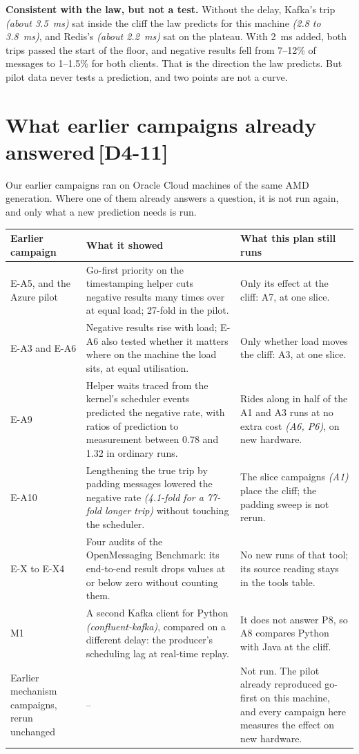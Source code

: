 \documentclass[11pt]{article}
\newcommand{\gl}[1]{{\color{soft}\itshape\small (#1)}}
\newcommand{\chgold}[1]{\,{\color{oldcol}\bfseries\footnotesize[#1]}}
\begin{document}
\textbf{Consistent with the law, but not a test.} Without the delay, Kafka's trip \gl{about 3.5~ms} sat inside the cliff the law predicts for this machine \gl{2.8 to 3.8~ms}, and Redis's \gl{about 2.2~ms} sat on the plateau. With 2~ms added, both trips passed the start of the floor, and negative results fell from 7--12\% of messages to 1--1.5\% for both clients. That is the direction the law predicts. But pilot data never tests a prediction, and two points are not a curve.

\section[What earlier campaigns already answered]{What earlier campaigns already answered\protect\chgold{D4-11}}\label{sec:earlier}
Our earlier campaigns ran on Oracle Cloud machines of the same AMD generation. Where one of them already answers a question, it is not run again, and only what a new prediction needs is run.

{\small
\begin{longtable}{@{}>{\raggedright\arraybackslash}p{2.9cm} >{\raggedright\arraybackslash}p{6.5cm} >{\raggedright\arraybackslash}p{6.4cm}@{}}
\toprule
\textbf{Earlier campaign} & \textbf{What it showed} & \textbf{What this plan still runs} \\
\midrule
\endhead
E-A5, and the Azure pilot & Go-first priority on the timestamping helper cuts negative results many times over at equal load; 27-fold in the pilot. & Only its effect at the cliff: A7, at one slice. \\
E-A3 and E-A6 & Negative results rise with load; E-A6 also tested whether it matters where on the machine the load sits, at equal utilisation. & Only whether load moves the cliff: A3, at one slice. \\
E-A9 & Helper waits traced from the kernel's scheduler events predicted the negative rate, with ratios of prediction to measurement between 0.78 and 1.32 in ordinary runs. & Rides along in half of the A1 and A3 runs at no extra cost \gl{A6, P6}, on new hardware. \\
E-A10 & Lengthening the true trip by padding messages lowered the negative rate \gl{4.1-fold for a 77-fold longer trip} without touching the scheduler. & The slice campaigns \gl{A1} place the cliff; the padding sweep is not rerun. \\
E-X to E-X4 & Four audits of the OpenMessaging Benchmark: its end-to-end result drops values at or below zero without counting them. & No new runs of that tool; its source reading stays in the tools table. \\
M1 & A second Kafka client for Python \gl{confluent-kafka}, compared on a different delay: the producer's scheduling lag at real-time replay. & It does not answer P8, so A8 compares Python with Java at the cliff. \\
Earlier mechanism campaigns, rerun unchanged & -- & Not run. The pilot already reproduced go-first on this machine, and every campaign here measures the effect on new hardware. \\
\bottomrule
\end{longtable}}
\end{document}
